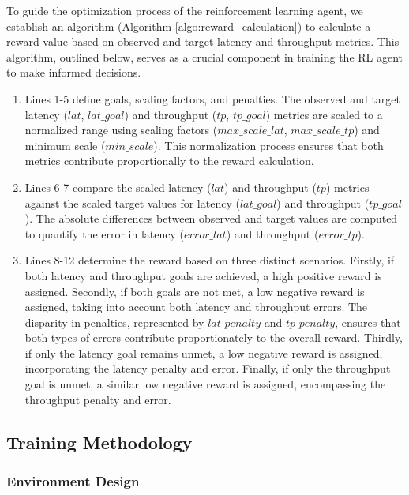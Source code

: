 To guide the optimization process of the reinforcement learning agent, we establish an algorithm (Algorithm \ref{algo:reward_calculation}) to calculate a reward value based on observed and target latency and throughput metrics. This algorithm, outlined below, serves as a crucial component in training the RL agent to make informed decisions.

\begin{enumerate}
  \item Lines 1-5 define goals, scaling factors, and penalties. The observed and target latency ($lat$, $lat\_goal$) and throughput ($tp$, $tp\_goal$) metrics are scaled to a normalized range using scaling factors ($max\_scale\_lat$, $max\_scale\_tp$) and minimum scale ($min\_scale$). This normalization process ensures that both metrics contribute proportionally to the reward calculation.
  \item Lines 6-7 compare the scaled latency ($lat$) and throughput ($tp$) metrics against the scaled target values for latency ($lat\_goal$) and throughput ($tp\_goal$). The absolute differences between observed and target values are computed to quantify the error in latency ($error\_lat$) and throughput ($error\_tp$).
  \item Lines 8-12 determine the reward based on three distinct scenarios. Firstly, if both latency and throughput goals are achieved, a high positive reward is assigned. Secondly, if both goals are not met, a low negative reward is assigned, taking into account both latency and throughput errors. The disparity in penalties, represented by $lat\_penalty$ and $tp\_penalty$, ensures that both types of errors contribute proportionately to the overall reward. Thirdly, if only the latency goal remains unmet, a low negative reward is assigned, incorporating the latency penalty and error. Finally, if only the throughput goal is unmet, a similar low negative reward is assigned, encompassing the throughput penalty and error.
\end{enumerate}

\subsection{Training Methodology}

\subsubsection{Environment Design}

